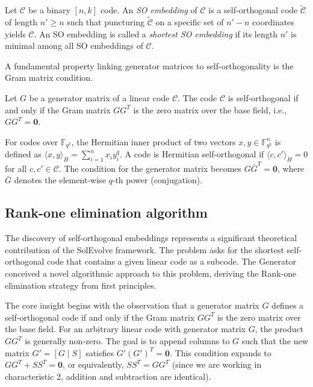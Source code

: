 \begin{definition}
Let $\mathcal{C}$ be a binary $[n,k]$ code. An \textit{SO embedding} of $\mathcal{C}$ is a self-orthogonal code $\tilde{\mathcal{C}}$ of length $n' \ge n$ such that puncturing $\tilde{\mathcal{C}}$ on a specific set of $n' - n$ coordinates yields $\mathcal{C}$. An SO embedding is called a \textit{shortest SO embedding} if its length $n'$ is minimal among all SO embeddings of $\mathcal{C}$.
\end{definition}

A fundamental property linking generator matrices to self-orthogonality is the Gram matrix condition.

\begin{proposition}
Let $G$ be a generator matrix of a linear code $\mathcal{C}$. The code $\mathcal{C}$ is self-orthogonal if and only if the Gram matrix $GG^T$ is the zero matrix over the base field, i.e., $GG^T = \mathbf{0}$.
\end{proposition}

\begin{definition}
For codes over $\mathbb{F}_{q^2}$, the Hermitian inner product of two vectors $x, y \in \mathbb{F}_{q^2}^n$ is defined as $\langle x, y \rangle_H = \sum_{i=1}^n x_i y_i^q$. A code is Hermitian self-orthogonal if $\langle c, c' \rangle_H = 0$ for all $c, c' \in \mathcal{C}$. The condition for the generator matrix becomes $G \bar{G}^T = \mathbf{0}$, where $\bar{G}$ denotes the element-wise $q$-th power (conjugation).
\end{definition}

\subsection{Rank-one elimination algorithm}
The discovery of self-orthogonal embeddings represents a significant theoretical contribution of the SolEvolve framework. The problem asks for the shortest self-orthogonal code that contains a given linear code as a subcode. The Generator conceived a novel algorithmic approach to this problem, deriving the Rank-one elimination strategy from first principles.

The core insight begins with the observation that a generator matrix $G$ defines a self-orthogonal code if and only if the Gram matrix $GG^T$ is the zero matrix over the base field. For an arbitrary linear code with generator matrix $G$, the product $GG^T$ is generally non-zero. The goal is to append columns to $G$ such that the new matrix $G' = [G \mid S]$ satisfies $G'(G')^T = \mathbf{0}$. This condition expands to $GG^T + SS^T = \mathbf{0}$, or equivalently, $SS^T = GG^T$ (since we are working in characteristic 2, addition and subtraction are identical).

